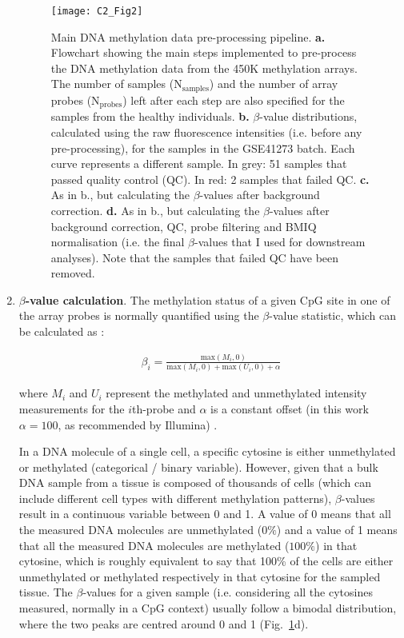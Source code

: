 \begin{enumerate}
	
	\begin{figure}[htbp!] 
		\centering    
		\texttt{[image: C2\_Fig2]}
		\vspace*{2mm}
		\caption[Main DNA methylation data pre-processing pipeline]{Main DNA methylation data pre-processing pipeline. \textbf{a.} Flowchart showing the main steps implemented to pre-process the DNA methylation data from the 450K methylation arrays. The number of samples (N$_{\text{samples}}$) and the number of array probes (N$_{\text{probes}}$) left after each step are also specified for the samples from the healthy individuals. \textbf{b.}  $\beta$-value distributions, calculated using the raw fluorescence intensities (i.e. before any pre-processing), for the samples in the GSE41273 batch. Each curve represents a different sample. In grey: 51 samples that passed quality control (QC). In red: 2 samples that failed QC.  \textbf{c.} As in b., but calculating the $\beta$-values after background correction. \textbf{d.} As in b., but calculating the $\beta$-values after background correction, QC, probe filtering and BMIQ normalisation (i.e. the final $\beta$-values that I used for downstream analyses). Note that the samples that failed QC have been removed.}
		\label{fig:c2_fig2}
	\end{figure}
	
	
	\item \textbf{$\beta$-value calculation}. The methylation status of a given CpG site in one of the array probes is normally quantified using the $\beta$-value statistic, which can be calculated as \cite{Wilhelm-Benartzi2013,Du2010}:
	
	\begin{align}
	\beta_i = \frac{\text{max}(M_i,0)}{\text{max}(M_i,0) + \text{max}(U_i,0) + \alpha}
	\end{align}
	
	where $M_i$ and $U_i$ represent the methylated and unmethylated intensity measurements for the $i$th-probe and $\alpha$ is a constant offset (in this work $\alpha = 100$, as recommended by Illumina) \cite{Du2010}. 
	
	In a DNA molecule of a single cell, a specific cytosine is either unmethylated or methylated (categorical / binary variable). However, given that a bulk DNA sample from a tissue is composed of thousands of cells (which can include different cell types with different methylation patterns), $\beta$-values result in a continuous variable between 0 and 1. A value of 0 means that all the measured DNA molecules are unmethylated ($0\%$) and a value of 1 means that all the measured DNA molecules are methylated ($100\%$) in that cytosine, which is roughly equivalent to say that 100\% of the cells are either unmethylated or methylated respectively in that cytosine for the sampled tissue. The $\beta$-values for a given sample (i.e. considering all the cytosines measured, normally in a CpG context) usually follow a bimodal distribution, where the two peaks are centred around 0 and 1 (Fig.~\ref{fig:c2_fig2}d). 
	

\end{enumerate}
